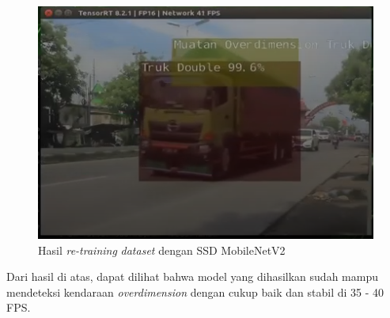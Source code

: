 \begin{figure}[H]
    \centering
    \includegraphics[scale=0.6]{gambar/bab4-hasil-retrain.png}
    \caption{Hasil \emph{re-training} \emph{dataset} dengan SSD MobileNetV2}
    \label{fig:retrain}
\end{figure}

Dari hasil di atas, dapat dilihat bahwa model yang dihasilkan sudah mampu mendeteksi kendaraan \emph{overdimension} dengan cukup baik dan stabil di 35 - 40 FPS.
